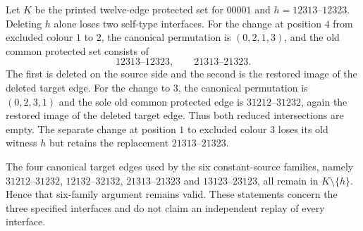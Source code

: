 Let $K$ be the printed twelve-edge protected set for $00001$ and
$h=12313\text{--}12323$. Deleting $h$ alone loses two self-type
interfaces. For the change at position $4$ from excluded colour $1$
to $2$, the canonical permutation is $(0,2,1,3)$, and the old
common protected set consists of
\[
12313\text{--}12323,\qquad21313\text{--}21323.
\]
The first is deleted on the source side and the second is the
restored image of the deleted target edge. For the change to $3$,
the canonical permutation is $(0,2,3,1)$ and the sole old common
protected edge is $31212\text{--}31232$, again the restored image
of the deleted target edge. Thus both reduced intersections are empty.
The separate change at position $1$ to excluded colour $3$ loses
its old witness $h$ but retains the replacement
$21313\text{--}21323$.

The four canonical target edges used by the six constant-source
families, namely $31212\text{--}31232$, $12132\text{--}32132$,
$21313\text{--}21323$ and $13123\text{--}23123$, all remain in
$K\setminus\{h\}$. Hence that six-family argument remains valid.
These statements concern the three specified interfaces and do not
claim an independent replay of every interface.
